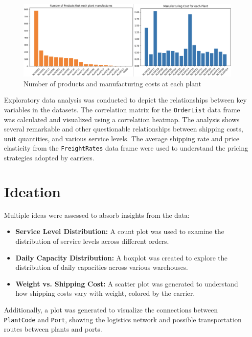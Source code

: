 \documentclass{article}
\begin{document}
\begin{figure}[!h]
     \begin{center}
     \includegraphics[width=0.7\paperwidth]{data_bar.png}
          \end{center}
     \caption{Number of products and manufacturing costs at each plant}
     \label{fig:cd}
\end{figure}


Exploratory data analysis was conducted to depict the relationships between key variables in the datasets. The correlation matrix for the \texttt{OrderList} data frame was calculated and visualized using a correlation heatmap. The analysis shows several remarkable and other questionable relationships between shipping costs, unit quantities, and various service levels. The average shipping rate and price elasticity from the \texttt{FreightRates} data frame were used to understand the pricing strategies adopted by carriers.

\section{Ideation}

Multiple ideas were assessed to absorb insights from the data:

\begin{itemize}
    \item \textbf{Service Level Distribution:} A count plot was used to examine the distribution of service levels across different orders.
    \item \textbf{Daily Capacity Distribution:} A boxplot was created to explore the distribution of daily capacities across various warehouses.
    \item \textbf{Weight vs. Shipping Cost:} A scatter plot was generated to understand how shipping costs vary with weight, colored by the carrier.
\end{itemize}

Additionally, a plot was generated to visualize the connections between \texttt{PlantCode} and \texttt{Port}, showing the logistics network and possible transportation routes between plants and ports.
\end{document}
